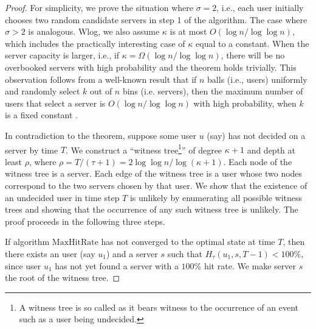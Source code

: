 \documentclass[conference]{IEEEtran}
\newcommand{\comment}[1]{}
\begin{document}
\begin{proof}
For simplicity, we prove the situation where $\sigma = 2$, i.e., each user initially chooses two random candidate servers in step 1 of the algorithm. The case where $\sigma > 2$ is analogous. 
\comment{Further we will assume that a user $u$ requesting application from an overbooked server $s$  at time $t$,  $0 \leq t \leq T$, has $H_\tau(i,j,t) <100\%$,  as the probability that this assumption is violated at most $1/ n^{\Omega(1)}$ as per Lemma~\ref{lem:overbookhit}.}  Wlog, we also assume  $\kappa$ is at most $O(\log n/ \log\log n)$, which includes the practically interesting case of  $\kappa$ equal to a constant.  When the server capacity is larger, i.e., if  $\kappa = \Omega(\log n/ \log\log n)$,  there will be no overbooked servers with high probability and the theorem holds trivially. This observation follows from a well-known result that if $n$ balls (i.e., users)  uniformly and randomly select $k$  out of $n$ bins (i.e. servers), then the maximum number of users that select a server is $O(\log n / \log\log n)$ with high probability, when  $k$ is a fixed constant \cite{raab1998balls}. 

In contradiction to the theorem, suppose some user $u$ (say) has not decided on a server  by time $T$. We construct a ``witness tree\footnote{A witness tree is so called as it bears witness to the occurrence of an event such as  a user being undecided.}''  of degree $\kappa + 1$ and depth at least $\rho$, where  $\rho = T/(\tau+1) =  2 \log\log n/\log (\kappa + 1)$. Each node of the witness tree is a server. Each edge of the witness tree is a user whose two nodes correspond to the two servers chosen by that user.  We show that the existence of an undecided user in time step $T$ is unlikely by enumerating all possible witness trees and showing that the occurrence of any such  witness tree is unlikely.  The proof proceeds in the following three steps.

  If algorithm $\mathrm{MaxHitRate}$ has not converged to the optimal state at time $T$, then there  exists an user (say $u_1$)  and a server $s$ such that $H_\tau(u_1, s, T-1) < 100\%$, since user $u_1$ has not yet found a server with a $100\%$ hit rate. We make server $s$ the root of the witness tree.



\end{proof}
\end{document}
